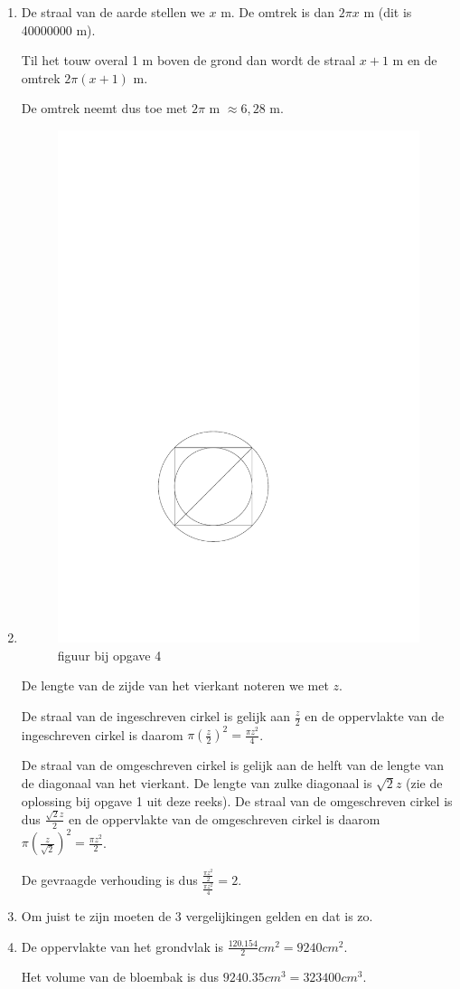 \documentclass{article}
\begin{document}
\begin{enumerate}
\item

De straal van de aarde stellen we $x$ m.
De omtrek is dan $2 \pi x$ m (dit is 40000000 m).

Til het touw overal 1 m boven de grond dan wordt de straal $x+1$ m en de omtrek $2 \pi (x+1)$ m.

De omtrek neemt dus toe met $2 \pi$ m $\approx 6,28$ m.

\item
\hfill

\begin{figure}[h]
\begin{center}
\includegraphics[height=4 cm]{TestOppInhoud4.pdf}
\caption{figuur bij opgave 4}
\end{center}
\end{figure}

De lengte van de zijde van het vierkant noteren we met $z$.

De straal van de ingeschreven cirkel is gelijk aan $\frac{z}{2}$ en de oppervlakte van de ingeschreven cirkel is daarom $\pi \left( \frac{z}{2} \right)^2=\frac {\pi z^2}{4}$.

De straal van de omgeschreven cirkel is gelijk aan de helft van de lengte van de diagonaal van het vierkant.
De lengte van zulke diagonaal is $\sqrt{2} z$ (zie de oplossing bij opgave 1 uit deze reeks).
De straal van de omgeschreven cirkel is dus $\frac{\sqrt{2}z}{2}$ en de oppervlakte van de omgeschreven cirkel is daarom $\pi \left( \frac {z}{\sqrt{2}} \right)^2=\frac {\pi z^2}{2}$.

De gevraagde verhouding is dus $\frac {\frac{\pi z^2}{2}}{\frac {\pi z^2}{4}}=2$.

\item

Om juist te zijn moeten de 3 vergelijkingen gelden en dat is zo.

\item

De oppervlakte van het grondvlak is $\frac{120.154}{2} cm^2=9240 cm^2$.

Het volume van de bloembak is dus $9240.35 cm^3=323400 cm^3$.


\end{enumerate}
\end{document}
